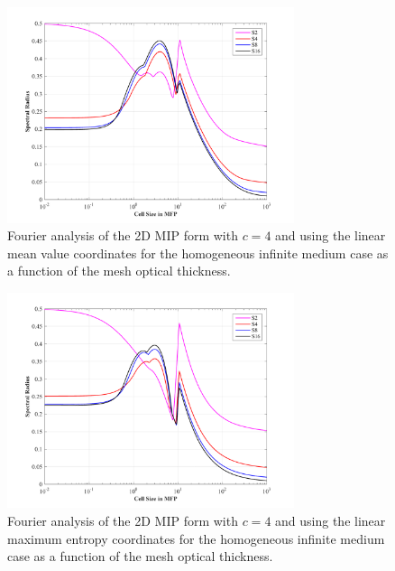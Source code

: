 \begin{figure}
\centering
\includegraphics[width=0.75\textwidth]{figures/sec_DSA/SI_MIP_quad_C=4_MV1_LS2,4,8,16.png}
\caption{Fourier analysis of the 2D MIP form with $c=4$ and using the linear mean value coordinates for the homogeneous infinite medium case as a function of the mesh optical thickness.}
\label{fig::DSA_1G_Fourier_MV1}
\end{figure}

\begin{figure}
\centering
\includegraphics[width=0.75\textwidth]{figures/sec_DSA/SI_MIP_quad_C=4_MAXENT1_LS2,4,8,16.png}
\caption{Fourier analysis of the 2D MIP form with $c=4$ and using the linear maximum entropy coordinates for the homogeneous infinite medium case as a function of the mesh optical thickness.}
\label{fig::DSA_1G_Fourier_ME1}
\end{figure}

